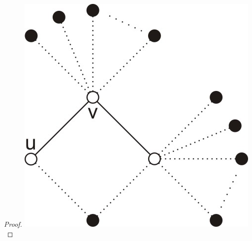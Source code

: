 \documentclass{pracamgr}
\begin{document}
\begin{proof}
    \includegraphics{img/Q_niezablokowane_3.jpg}
    \end{proof}
\end{document}
